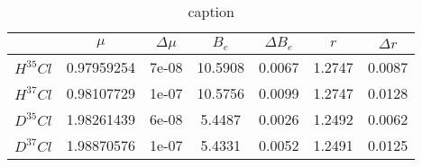 \begin{table}
\centering
\caption{caption}
\label{}
\begin{tabular}{lcccccc}
\toprule
{} &      $\mu$ & $\Delta\mu$ &   $B_e$ & $\Delta B_e$ &    $r$ & $\Delta r$ \\
\midrule
$H^{35}Cl$ & 0.97959254 &       7e-08 & 10.5908 &       0.0067 & 1.2747 &     0.0087 \\
$H^{37}Cl$ & 0.98107729 &       1e-07 & 10.5756 &       0.0099 & 1.2747 &     0.0128 \\
$D^{35}Cl$ & 1.98261439 &       6e-08 &  5.4487 &       0.0026 & 1.2492 &     0.0062 \\
$D^{37}Cl$ & 1.98870576 &       1e-07 &  5.4331 &       0.0052 & 1.2491 &     0.0125 \\
\bottomrule
\end{tabular}
\end{table}
